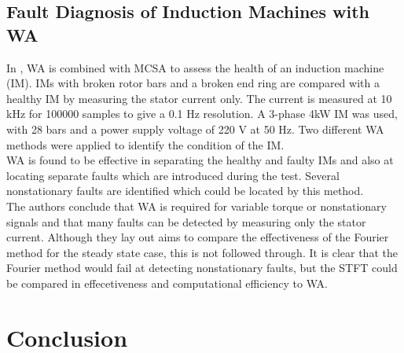 \documentclass[conference]{IEEEtran}
\begin{document}
\subsection{Fault Diagnosis of Induction Machines with WA}
In \cite{Wavelet Study}, WA is combined with MCSA to assess the health of an induction machine (IM). IMs with broken rotor bars and a broken end ring are compared with a healthy IM by measuring the stator current only. The current is measured at 10 kHz for \num{100000} samples to give a 0.1 Hz resolution. A 3-phase 4kW IM was used, with 28 bars and a power supply voltage of 220 V at 50 Hz. Two different WA methods were applied to identify the condition of the IM.\\
WA is found to be effective in separating the healthy and faulty IMs and also at locating separate faults which are introduced during the test. Several nonstationary faults are identified which could be located by this method.\\
The authors conclude that WA is required for variable torque or nonstationary signals and that many faults can be detected by measuring only the stator current. Although they lay out aims to compare the effectiveness of the Fourier method for the steady state case, this is not followed through. It is clear that the Fourier method would fail at detecting nonstationary faults, but the STFT could be compared in effecetiveness and computational efficiency to WA.

\section{Conclusion}











\end{document}
